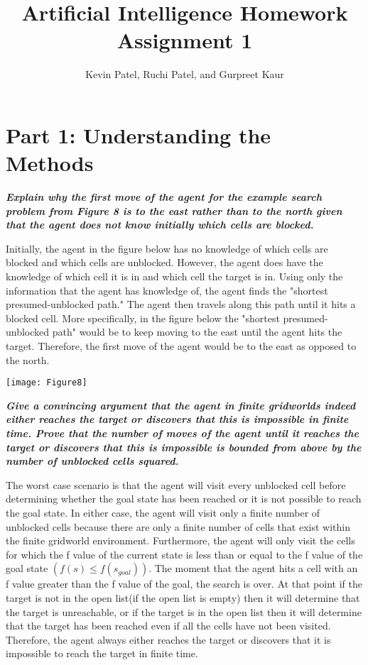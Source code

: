 \documentclass[]{report}
\title{Artificial Intelligence Homework Assignment 1}
\author{Kevin Patel, Ruchi Patel, and Gurpreet Kaur}
\begin{document}
\maketitle

\section*{Part 1: Understanding the Methods}
\textbf{\textit{Explain why the first move of the agent for the example search problem from Figure 8 is to the east rather than to the north given that the agent does not know initially which cells are blocked.}}

\hangindent=0.5cm
Initially, the agent in the figure below has no knowledge of which cells are blocked and which cells are unblocked. However, the agent does have the knowledge of which cell it is in and which cell the target is in. Using only the information that the agent has knowledge of, the agent finds the "shortest presumed-unblocked path." The agent then travels along this path until it hits a blocked cell. More specifically, in the figure below the "shortest presumed-unblocked path" would be to keep moving to the east until the agent hits the target. Therefore, the first move of the agent would be to the east as opposed to the north. 

\begin{center}
	\texttt{[image: Figure8]}
\end{center}

\noindent
\textbf{\textit{Give a convincing argument that the agent in finite gridworlds indeed either reaches the target or discovers that this is impossible in finite time. Prove that the number of moves of the agent until it reaches the target or discovers that this is impossible is bounded from above by the number of unblocked cells squared.}}

\hangindent=0.5cm
The worst case scenario is that the agent will visit every unblocked cell before determining whether the goal state has been reached or it is not possible to reach the goal state. In either case, the agent will visit only a finite number of unblocked cells because there are only a finite number of cells that exist within the finite gridworld environment.  Furthermore, the agent will only visit the cells for which the f value of the current state is less than or equal to the f value of the goal state $(f(s) \leq f(s_{goal}))$. The moment that the agent hits a cell with an f value greater than the f value of the goal, the search is over. At that point if the target is not in the open list(if the open list is empty) then it will determine that the target is unreachable, or if the target is in the open list then it will determine that the target has been reached even if all the cells have not been visited. Therefore, the agent always either reaches the target or discovers that it is impossible to reach the target in finite time. 
\\
\end{document}
